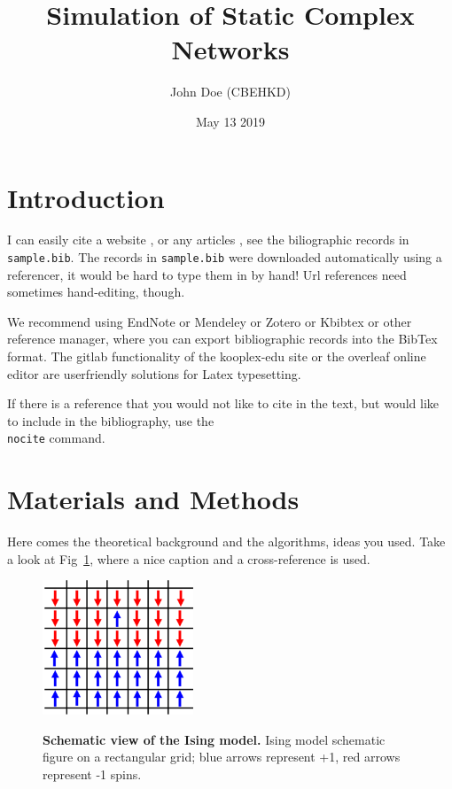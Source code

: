 \documentclass[a4paper,11pt,pdftex]{article}
\title{Simulation of Static Complex Networks}
\author{John Doe (CBEHKD)}
\date{May 13 2019}
\begin{document}
\pagestyle{fancy}

\maketitle

\tableofcontents

\section{Introduction}

I can easily cite a website \cite{leip}, or any articles \cite{Llorente2015}, see the biliographic records in \texttt{sample.bib}. The records in \texttt{sample.bib} were downloaded automatically using a referencer, it would be hard to type them in by hand! Url references need sometimes hand-editing, though.

We recommend using EndNote or Mendeley or Zotero or Kbibtex or other reference manager, where you can export bibliographic records into the BibTex format. The gitlab functionality of the kooplex-edu site or the overleaf online editor are userfriendly solutions for Latex typesetting. 

If there is a reference that you would not like to cite in the text, but would like to include in the bibliography, use the \texttt{\\nocite} command.

\section{Materials and Methods}

Here comes the theoretical background and the algorithms, ideas you used. Take a look at Fig~\ref{fig:ising}, where a nice caption and a cross-reference is used.

\begin{figure}[h!]
 \begin{center}
  \includegraphics[width=0.4\textwidth]{ising.png}
  \label{fig:ising}
  \caption{\textbf{Schematic view of the Ising model.} Ising model schematic figure on a rectangular grid; blue arrows represent +1, red arrows represent -1 spins.}
 \end{center}

\end{figure}
\end{document}
